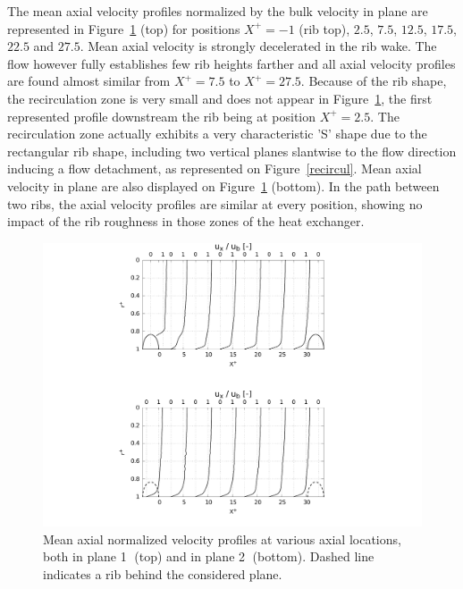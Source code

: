 The mean axial velocity profiles normalized by the bulk velocity in plane  are represented in Figure~\ref{Ux_mean} (top) for positions $X^+=-1$ (rib top), $2.5$, $7.5$, $12.5$, $17.5$, $22.5$ and $27.5$. Mean axial velocity is strongly decelerated in the rib wake. The flow however fully establishes few rib heights farther and all axial velocity profiles are found almost similar from $X^+=7.5$ to $X^+=27.5$. Because of the rib shape, the recirculation zone is very small and does not appear in Figure~\ref{Ux_mean}, the first represented profile downstream the rib being at position $X^+=2.5$. The recirculation zone actually exhibits a very characteristic 'S' shape due to the rectangular rib shape, including two vertical planes slantwise to the flow direction inducing a flow detachment, as represented on Figure~\ref{recircul}. Mean axial velocity in plane  are also displayed on Figure~\ref{Ux_mean} (bottom). In the path between two ribs, the axial velocity profiles are similar at every position, showing no impact of the rib roughness in those zones of the heat exchanger.\\

\begin{figure}[!h]
\centering
\includegraphics[width=0.7\linewidth,keepaspectratio]{fig/applications/optim/Axial_vel.pdf}
\caption{Mean axial normalized velocity profiles at various axial locations, both in plane \textcircled{1} (top) and in plane \textcircled{2} (bottom). Dashed line indicates a rib behind the considered plane.}
\label{Ux_mean}
\end{figure}

